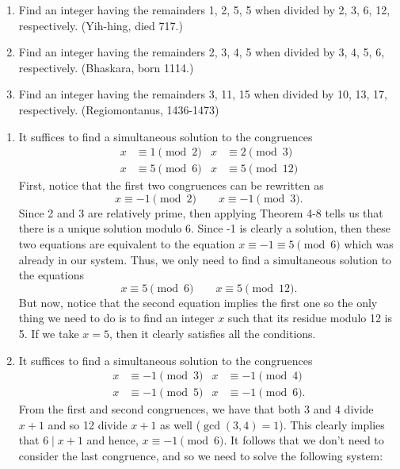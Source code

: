 \begin{exercise}
    \begin{enumerate}
        \item Find an integer having the remainders 1, 2, 5, 5 when divided by 2, 3, 6, 12, respectively. (Yih-hing, died 717.)
        \item Find an integer having the remainders 2, 3, 4, 5 when divided by 3, 4, 5, 6, respectively. (Bhaskara, born 1114.)
        \item Find an integer having the remainders 3, 11, 15 when divided by 10, 13, 17, respectively. (Regiomontanus, 1436-1473)
    \end{enumerate}
\end{exercise}

\begin{solution}
    \begin{enumerate}
        \item It suffices to find a simultaneous solution to the congruences
        \begin{align*}
            x &\equiv 1 \pmod{2} & x &\equiv 2 \pmod{3} \\
            x &\equiv 5 \pmod{6} & x &\equiv 5 \pmod{12}
        \end{align*}
        First, notice that the first two congruences can be rewritten as
        $$x \equiv -1 \pmod 2 \qquad x \equiv - 1 \pmod{3}.$$
        Since 2 and 3 are relatively prime, then applying Theorem 4-8 tells us that there is a unique solution modulo 6. Since -1 is clearly a solution, then these two equations are equivalent to the equation $x \equiv -1 \equiv 5 \pmod{6}$ which was already in our system. Thus, we only need to find a simultaneous solution to the equations
        $$x \equiv 5 \pmod{6} \qquad x \equiv 5 \pmod{12}.$$
        But now, notice that the second equation implies the first one so the only thing we need to do is to find an integer $x$ such that its residue modulo 12 is 5. If we take $x = 5$, then it clearly satisfies all the conditions.
        \item It suffices to find a simultaneous solution to the congruences
        \begin{align*}
            x &\equiv -1 \pmod{3} & x &\equiv -1 \pmod{4} \\
            x &\equiv -1 \pmod{5} & x &\equiv -1 \pmod{6}.
        \end{align*}
        From the first and second congruences, we have that both 3 and 4 divide $x + 1$ and so 12 divide $x + 1$ as well ($\gcd(3,4) = 1$). This clearly implies that $6 \mid x + 1$ and hence, $x \equiv -1 \pmod 6$. It follows that we don't need to consider the last congruence, and so we need to solve the following system:

\end{enumerate}
\end{solution}
